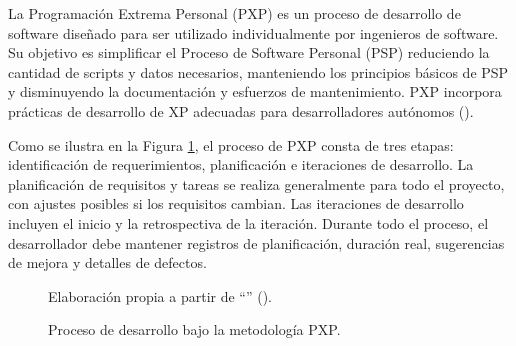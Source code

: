La Programación Extrema Personal (PXP) es un proceso de desarrollo de software diseñado para ser utilizado individualmente por ingenieros de software. Su objetivo es simplificar el Proceso de Software Personal (PSP) reduciendo la cantidad de scripts y datos necesarios, manteniendo los principios básicos de PSP y disminuyendo la documentación y esfuerzos de mantenimiento. PXP incorpora prácticas de desarrollo de XP adecuadas para desarrolladores autónomos (\cite{dzhurov2009personal}). 

\indent
Como se ilustra en la Figura \ref{fig:modelo_desarrollo_pxp}, el proceso de PXP consta de tres etapas: identificación de requerimientos, planificación e iteraciones de desarrollo. La planificación de requisitos y tareas se realiza generalmente para todo el proyecto, con ajustes posibles si los requisitos cambian. Las iteraciones de desarrollo incluyen el inicio y la retrospectiva de la iteración. Durante todo el proceso, el desarrollador debe mantener registros de planificación, duración real, sugerencias de mejora y detalles de defectos.

\begin{figure}[htb]
	\centering
    
    \vspace{-0.5cm}
    \caption{Proceso de desarrollo bajo la metodología PXP.}
    \vspace{-0.2cm}
    \footnotesize{{Elaboración propia a partir de ``\textit{}'' (\citeyear{dzhurov2009personal}).}}
	\label{fig:modelo_desarrollo_pxp} 
\end{figure}

